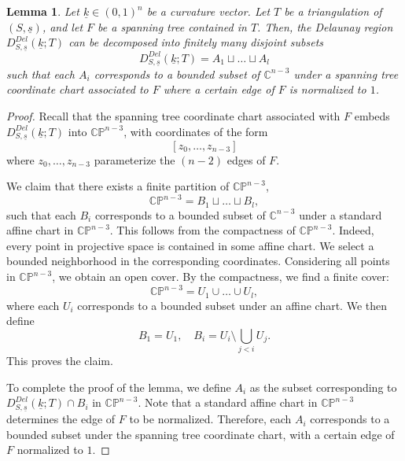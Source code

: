 \documentclass{compositio}
\numberwithin{equation}{section}
\numberwithin{figure}{section}
\theoremstyle{definition}
\theoremstyle{plain}
\newtheorem{lemma}[definition]{Lemma}
\begin{document}
{\begin{lemma}\label{lem:compactdelaunay}
Let $\underline{k}\in(0,1)^n$ be a curvature vector. Let $T$ be a triangulation of $(S,\underline{s})$, and let $F$ be a spanning tree contained in $T$. Then, the Delaunay region $D_{S,\underline{s}}^{Del}(\underline{k};T)$ can be decomposed into finitely many disjoint subsets
\begin{equation}\label{equ:compactdelaunay}
    D_{S,\underline{s}}^{Del}(\underline{k};T) = A_1 \sqcup \ldots \sqcup A_l
\end{equation}
such that each $A_i$ corresponds to a bounded subset of $\mathbb{C}^{n-3}$ under a spanning tree coordinate chart associated to $F$ where a certain edge of $F$ is normalized to $1$.
\end{lemma}

\begin{proof}
    Recall that the spanning tree coordinate chart associated with $F$ embeds $D_{S,\underline{s}}^{Del}(\underline{k};T)$ into $\mathbb{CP}^{n-3}$, with coordinates of the form
    $$
    [z_0, \ldots, z_{n-3}]
    $$
    where $z_0, \ldots, z_{n-3}$ parameterize the $(n-2)$ edges of $F$.

    We claim that there exists a finite partition of $\mathbb{CP}^{n-3}$,
    $$
    \mathbb{CP}^{n-3} = B_1 \sqcup \ldots \sqcup B_l,
    $$
    such that each $B_i$ corresponds to a bounded subset of $\mathbb{C}^{n-3}$ under a standard affine chart in $\mathbb{CP}^{n-3}$. This follows from the compactness of $\mathbb{CP}^{n-3}$. Indeed, every point in projective space is contained in some affine chart. We select a bounded neighborhood in the corresponding coordinates. Considering all points in $\mathbb{CP}^{n-3}$, we obtain an open cover. By the compactness, we find a finite cover:
    $$
    \mathbb{CP}^{n-3} = U_1 \cup \ldots \cup U_l,
    $$
    where each $U_i$ corresponds to a bounded subset under an affine chart. We then define
    $$
    B_1 = U_1, \quad B_i = U_i \setminus \bigcup_{j < i} U_j.
    $$
    This proves the claim.

    To complete the proof of the lemma, we define $A_i$ as the subset corresponding to $D_{S,\underline{s}}^{Del}(\underline{k};T) \cap B_i$ in $\mathbb{CP}^{n-3}$. Note that a standard affine chart in $\mathbb{CP}^{n-3}$ determines the edge of $F$ to be normalized. Therefore, each $A_i$ corresponds to a bounded subset under the spanning tree coordinate chart, with a certain edge of $F$ normalized to $1$.
\end{proof}


}
\end{document}
